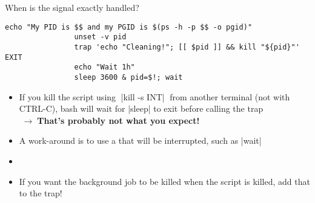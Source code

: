 \begin{frame}[fragile]{When is the signal exactly handled?}
\begin{overlayarea}{\textwidth}{0.33\textheight}
\begin{onlyenv}
\begin{lstlisting}[style=MyBash, firstnumber=14]
                echo "My PID is $$ and my PGID is $(ps -h -p $$ -o pgid)"
                unset -v pid
                trap 'echo "Cleaning!"; [[ $pid ]] && kill "${pid}"' EXIT
                echo "Wait 1h"
                sleep 3600 & pid=$!; wait
            \end{lstlisting}
        \end{onlyenv}
    \end{overlayarea}
    \begin{itemize}
        \item If you kill the script using $\;$\bash|kill -s INT|$\;$ from another terminal (not with CTRL-C), bash will wait for \bash|sleep| to exit before calling the trap\\
              $\;\to\;$\alert{\textbf{That's probably not what you expect!}}
        \item<2-> A work-around is to use a  that will be interrupted, such as \bash|wait|
        \item<2-> 
        \item<3-> If you want the background job to be killed when the script is killed, add that to the trap!
    \end{itemize}
\end{frame}
